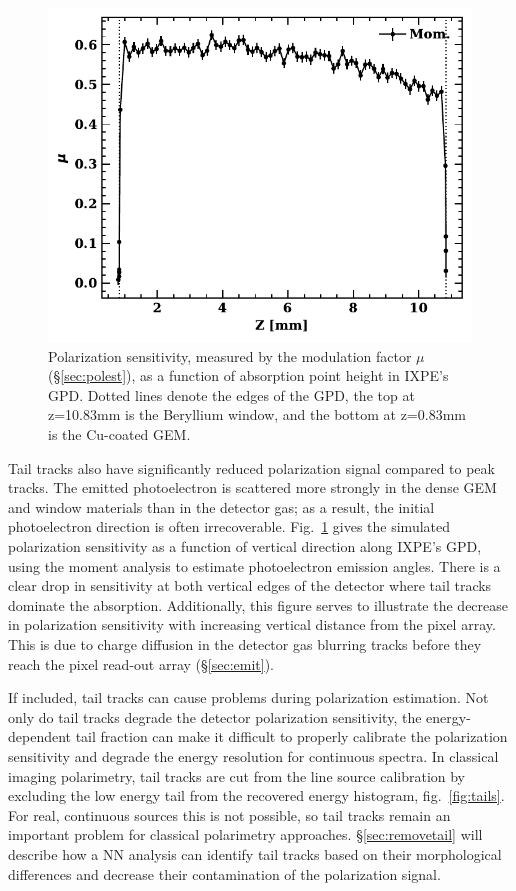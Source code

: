 \begin{figure}[t]
\centering
\includegraphics[scale=.75]{figures/z_mu.pdf}
\caption{Polarization sensitivity, measured by the modulation factor $\mu$ (\S\ref{sec:polest}), as a function of absorption point height in IXPE's GPD. Dotted lines denote the edges of the GPD, the top at z=10.83mm is the Beryllium window, and the bottom at z=0.83mm is the Cu-coated GEM.}
\label{fig:z}       %
\end{figure}

Tail tracks also have significantly reduced polarization signal compared to peak tracks. The emitted photoelectron is scattered more strongly in the dense GEM and window materials than in the detector gas; as a result, the initial photoelectron direction is often irrecoverable. Fig.~\ref{fig:z} gives the simulated polarization sensitivity as a function of vertical direction along IXPE's GPD, using the moment analysis to estimate photoelectron emission angles. There is a clear drop in sensitivity at both vertical edges of the detector where tail tracks dominate the absorption. Additionally, this figure serves to illustrate the decrease in polarization sensitivity with increasing vertical distance from the pixel array. This is due to charge diffusion in the detector gas blurring tracks before they reach the pixel read-out array (\S\ref{sec:emit}).

If included, tail tracks can cause problems during polarization estimation. Not only do tail tracks degrade the detector polarization sensitivity, the energy-dependent tail fraction can make it difficult to properly calibrate the polarization sensitivity and degrade the energy resolution for continuous spectra. In classical imaging polarimetry, tail tracks are cut from the line source calibration by excluding the low energy tail from the recovered energy histogram, fig.~\ref{fig:tails}. For real, continuous sources this is not possible, so tail tracks remain an important problem for classical polarimetry approaches. \S\ref{sec:removetail} will describe how a NN analysis can identify tail tracks based on their morphological differences and decrease their contamination of the polarization signal.

